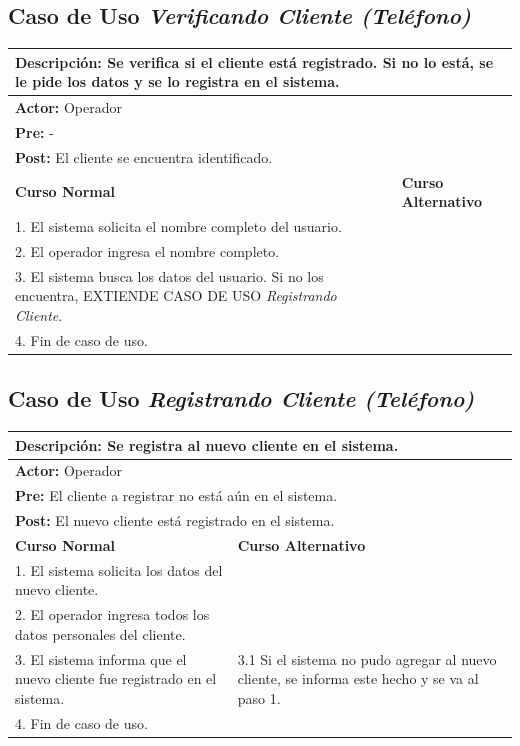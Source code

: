 \documentclass[a4paper]{article}
\begin{document}
\subsection{Caso de Uso \textit{Verificando Cliente (Tel\'efono)}}
\begin{center}
\begin{tabular}{|p{10cm} | p{6cm}|}
\hline
\multicolumn{2}{|p{16cm}|}{\textbf{Descripci\'on:} Se verifica si el cliente est\'a registrado. Si no lo est\'a, se le pide los datos y se lo registra en el sistema.} \\
\hline
\multicolumn{2}{|l|}{\textbf{Actor:} Operador} \\
\hline
\multicolumn{2}{|l|}{\textbf{Pre:} -} \\
\hline
\multicolumn{2}{|p{14cm}|}{\textbf{Post:} El cliente se encuentra identificado.}\\
\hline
\textbf{Curso Normal}  & \textbf{Curso Alternativo} \\ \hline
1. El sistema solicita el nombre completo del usuario. & \\ \hline
2. El operador ingresa el nombre completo. & \\ \hline
3. El sistema busca los datos del usuario. Si no los encuentra, EXTIENDE CASO DE USO \textit{Registrando Cliente}. & \\ \hline
4. Fin de caso de uso. & \\ \hline
\end{tabular}
\end{center}

\subsection{Caso de Uso \textit{Registrando Cliente (Tel\'efono)}}
\begin{center}
\begin{tabular}{|p{10cm} | p{6cm}|}
\hline
\multicolumn{2}{|p{16cm}|}{\textbf{Descripci\'on:} Se registra al nuevo cliente en el sistema.} \\
\hline
\multicolumn{2}{|l|}{\textbf{Actor:} Operador} \\
\hline
\multicolumn{2}{|l|}{\textbf{Pre:} El cliente a registrar no est\'a a\'un en el sistema.} \\
\hline
\multicolumn{2}{|p{14cm}|}{\textbf{Post:} El nuevo cliente est\'a registrado en el sistema.}\\
\hline
\textbf{Curso Normal}  & \textbf{Curso Alternativo} \\ \hline
1. El sistema solicita los datos del nuevo cliente. & \\ \hline
2. El operador ingresa todos los datos personales del cliente. & \\ \hline
3. El sistema informa que el nuevo cliente fue registrado en el sistema. & 3.1 Si el sistema no pudo agregar al nuevo cliente, se informa este hecho y se va al paso 1. \\ \hline
4. Fin de caso de uso. & \\ \hline
\end{tabular}
\end{center}
\end{document}
